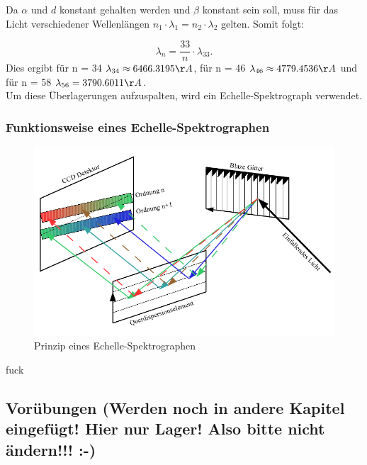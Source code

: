 Da $\alpha$ und $d$ konstant gehalten werden und $\beta$ konstant sein soll, muss für das Licht verschiedener Wellenlängen $n_1 \cdot \lambda_1 = n_2 \cdot \lambda_2$ gelten. Somit folgt: 

\begin{equation}
\lambda_n = \frac{33}{n} \cdot \lambda_{33}.
\end{equation}
Dies ergibt für n = 34 $\lambda_{34} \approx 6466.3195 \AA$, für n = 46 $\lambda_{46} \approx 4779.4536 \AA$ und für n = 58 $\lambda_{56} = 3790.6011 \AA$.\\

Um diese Überlagerungen aufzuspalten, wird ein Echelle-Spektrograph verwendet.

\subsubsection{Funktionsweise eines Echelle-Spektrographen}

\begin{figure}
		\includegraphics[width=.9\textwidth]{images/Abbildung104}
\caption{ Prinzip eines Echelle-Spektrographen }
\label{fig:104}
\end{figure}

fuck


\subsection{Vorübungen (Werden noch in andere Kapitel eingefügt! Hier nur Lager! Also bitte nicht ändern!!! :-) }

